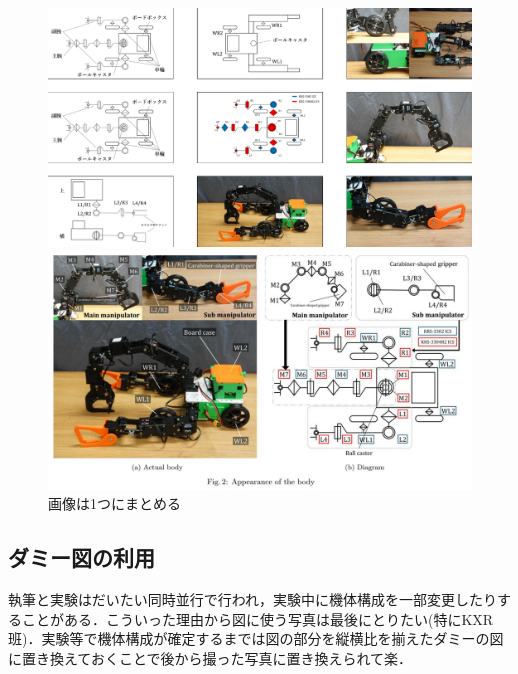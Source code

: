 \documentclass[twocolumn, a4paper]{Zemiresume}
\begin{document}
\begin{figure}[t]
  \centering
  \begin{minipage}{0.5\columnwidth}
    \centering
    \includegraphics[width=.98\linewidth]{img/画像の集約_悪い例.pdf}
  \end{minipage}%
  \begin{minipage}{0.5\columnwidth}
    \centering
    \includegraphics[width=.98\linewidth]{img/画像の集約_良い例.pdf}
  \end{minipage}
  \caption{画像は1つにまとめる}\label{fig:画像は1つにまとめる}
\end{figure}
\subsection{ダミー図の利用}
執筆と実験はだいたい同時並行で行われ，実験中に機体構成を一部変更したりすることがある．こういった理由から図に使う写真は最後にとりたい(特にKXR班)．実験等で機体構成が確定するまでは図の部分を縦横比を揃えたダミーの図に置き換えておくことで後から撮った写真に置き換えられて楽．
\end{document}
